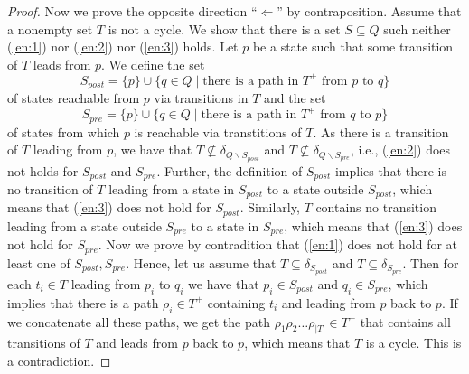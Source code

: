 \documentclass[a4paper,UKenglish,cleveref, autoref, thm-restate]{lipics-v2021}
\newcommand{\pre}{{S_\mathit{pre}}}
\newcommand{\post}{{S_\mathit{post}}}
\begin{document}
\begin{proof}
  Now we prove the opposite direction ``$\Longleftarrow$'' by
  contraposition. Assume that a nonempty set $T$ is not a cycle. We
  show that there is a set $S\subseteq Q$ such neither (\ref{en:1})
  nor (\ref{en:2}) nor (\ref{en:3}) holds. Let $p$ be a state such
  that some transition of $T$ leads from $p$. We define the set
  \[
    \post=\{p\}\cup\{q\in Q\mid \textrm{there is a path in }T^+\textrm{ from }p\textrm{ to }q\}
  \]
  of states reachable from $p$ via transitions in $T$ and the set
  \[
    \pre=\{p\}\cup\{q\in Q\mid \textrm{there is a path in }T^+\textrm{ from }q\textrm{ to }p\}
  \]  
  of states from which $p$ is reachable via transtitions of $T$. As
  there is a transition of $T$ leading from $p$, we have that
  $T\not\subseteq\delta_{Q\smallsetminus\post}$ and
  $T\not\subseteq\delta_{Q\smallsetminus\pre}$, i.e., (\ref{en:2})
  does not holds for $\post$ and $\pre$. Further, the definition of
  $\post$ implies that there is no transition of $T$ leading from a
  state in $\post$ to a state outside $\post$, which means that
  (\ref{en:3}) does not hold for $\post$. Similarly, $T$ contains no
  transition leading from a state outside $\pre$ to a state in $\pre$,
  which means that (\ref{en:3}) does not hold for $\pre$. Now we prove
  by contradition that (\ref{en:1}) does not hold for at least one of
  $\post,\pre$. Hence, let us assume that $T\subseteq\delta_\post$ and
  $T\subseteq\delta_\pre$. Then for each $t_i\in T$ leading from $p_i$
  to $q_i$ we have that $p_i\in\post$ and $q_i\in\pre$, which implies
  that there is a path $\rho_i\in T^+$ containing $t_i$ and leading
  from $p$ back to $p$. If we concatenate all these paths, we get the
  path $\rho_1\rho_2\ldots\rho_{|T|}\in T^+$ that contains all transitions of
  $T$ and leads from $p$ back to $p$, which means that $T$ is a cycle.
  This is a contradiction.
\end{proof}
\end{document}
